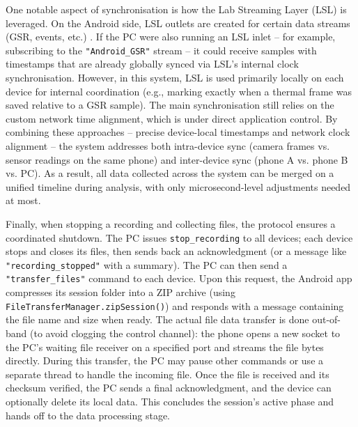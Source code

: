 One notable aspect of synchronisation is how the Lab Streaming Layer (LSL) is leveraged. On the Android side, LSL outlets are created for certain data streams (GSR, events, etc.) \citep{ref9}. If the PC were also running an LSL inlet -- for example, subscribing to the \texttt{"Android\_GSR"} stream -- it could receive samples with timestamps that are already globally synced via LSL's internal clock synchronisation. However, in this system, LSL is used primarily locally on each device for internal coordination (e.g., marking exactly when a thermal frame was saved relative to a GSR sample). The main synchronisation still relies on the custom network time alignment, which is under direct application control. By combining these approaches -- precise device-local timestamps and network clock alignment -- the system addresses both intra-device sync (camera frames vs. sensor readings on the same phone) and inter-device sync (phone A vs. phone B vs. PC). As a result, all data collected across the system can be merged on a unified timeline during analysis, with only microsecond-level adjustments needed at most.

Finally, when stopping a recording and collecting files, the protocol ensures a coordinated shutdown. The PC issues \texttt{stop\_recording} to all devices; each device stops and closes its files, then sends back an acknowledgment (or a message like \texttt{"recording\_stopped"} with a summary). The PC can then send a \texttt{"transfer\_files"} command to each device. Upon this request, the Android app compresses its session folder into a ZIP archive (using \texttt{FileTransferManager.zipSession()}) and responds with a message containing the file name and size when ready. The actual file data transfer is done out-of-band (to avoid clogging the control channel): the phone opens a new socket to the PC's waiting file receiver on a specified port and streams the file bytes directly. During this transfer, the PC may pause other commands or use a separate thread to handle the incoming file. Once the file is received and its checksum verified, the PC sends a final acknowledgment, and the device can optionally delete its local data. This concludes the session's active phase and hands off to the data processing stage.

